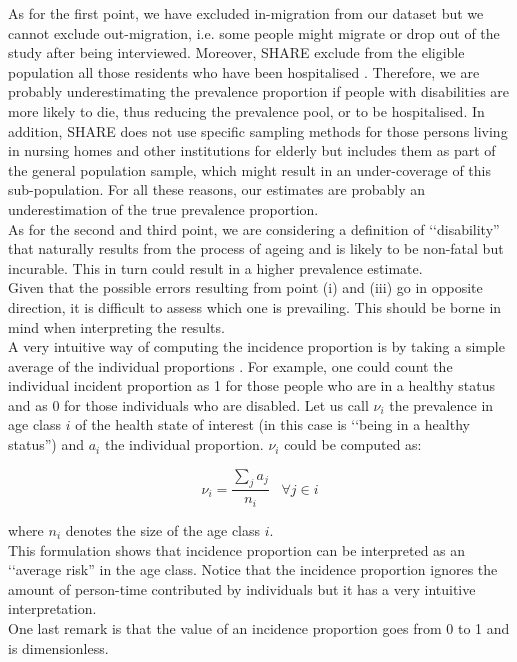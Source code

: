 As for the first point, we have excluded in-migration from our dataset but we cannot exclude out-migration, i.e. some people might migrate or drop out of the study after being interviewed. Moreover, SHARE exclude from the eligible population all those residents who have been hospitalised \citep{Bergmann2017}. Therefore, we are probably underestimating the prevalence proportion if people with disabilities are more likely to die, thus reducing the prevalence pool, or to be hospitalised. In addition, SHARE does not use specific sampling methods for those persons living in nursing homes and other institutions for elderly but includes them as part of the general population sample, which might result in an
under-coverage of this sub-population. 
For all these reasons, our estimates are probably an underestimation of the true prevalence proportion.\\
As for the second and third point, we are considering a definition of \lq\lq disability'' that naturally results from the process of ageing and is likely to be non-fatal but incurable.  This in turn could result in a higher prevalence estimate. \\
Given that the possible errors resulting from point (i) and (iii) go in opposite direction, it is difficult to assess which one is prevailing. This should be borne in mind when interpreting the results. \\








A very intuitive way of computing the incidence proportion is by taking a simple average of the individual proportions \citep{Rothman2008ModernEpidemiology}.  For example, one could count the individual incident proportion as 1 for those people who are in a healthy status and as 0 for those individuals who are disabled. Let us call $\nu_i$ the prevalence in age class $i$ of the health state of interest (in this case is \lq\lq being in a healthy status'') and $a_i$ the individual proportion. $\nu_i$ could be computed as:

\begin{equation}
    \nu_i = \frac{\sum_{j} a_j }{n_i} \;\;\; \forall j \in i
\end{equation}

where $n_i$ denotes the size of the age class $i$.\\
This formulation shows that incidence proportion can be interpreted as an \lq\lq average risk'' in the age class. Notice that the incidence proportion ignores the amount of person-time contributed by individuals but it has a very intuitive interpretation.\\
One last remark is that the value of an incidence proportion goes from 0 to 1 and is dimensionless. \\

